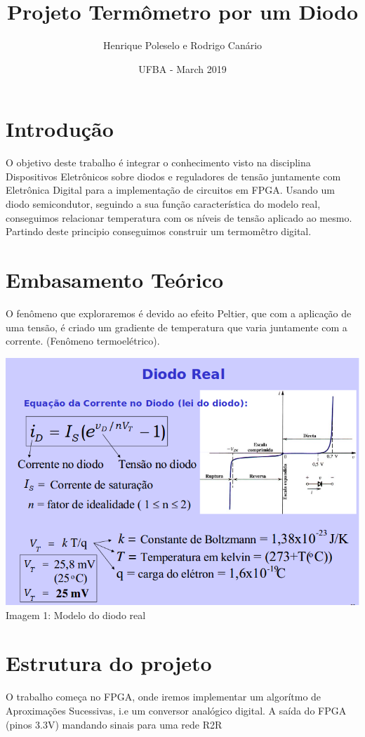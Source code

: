 \documentclass{article}
\title{Projeto Termômetro por um Diodo}
\author{Henrique Poleselo e Rodrigo Canário}
\date{UFBA - March 2019}
\begin{document}
\maketitle

\section{Introdução}
O objetivo deste trabalho é integrar o conhecimento visto na disciplina Dispositivos Eletrônicos sobre diodos e reguladores de tensão juntamente com Eletrônica Digital para a implementação de circuitos em FPGA.
Usando um diodo semicondutor, seguindo a sua função característica do modelo real, conseguimos relacionar temperatura com os níveis de tensão aplicado ao mesmo. Partindo deste principio conseguimos construir um termomêtro digital.

\section{Embasamento Teórico}
 O fenômeno que exploraremos é devido ao efeito Peltier, que com a aplicação de uma tensão, é criado um gradiente de temperatura que varia juntamente com a corrente. (Fenômeno termoelétrico).
\begin{center}
    \includegraphics[scale=0.5]{images/img1.png}
    Imagem 1: Modelo do diodo real
\end{center}

\section{Estrutura do projeto}
O trabalho começa no FPGA, onde iremos implementar um algorítmo de Aproximações Sucessivas, i.e um conversor analógico digital. A saída do FPGA (pinos 3.3V) mandando sinais para uma rede R2R
\end{document}
